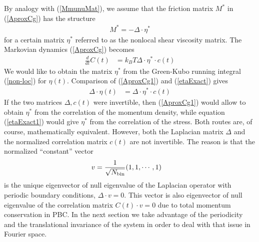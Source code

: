 \documentclass[b5paper,openright,10pt]{book}
\newcommand{\esc}{\!\cdot\!}
\begin{document}
By analogy with  (\ref{MmunuMat}), we assume that the  friction matrix $M^*$ in
(\ref{AproxCg}) has the structure
\begin{align}
  M^*=-\Delta\esc \eta^*
  \label{M*eta*}
\end{align}
for a  certain  matrix  $\eta^*$  referred to  as  the  nonlocal  shear
viscosity  matrix.  The Markovian  dynamics  (\ref{AproxCg})
becomes
\begin{align}
\frac{d}{dt}C(t)&=  k_BT\Delta\esc \eta^*\esc c(t)
\label{AproxCg1}
\end{align}
We  would like  to  obtain  the matrix  $\eta^*$  from the  Green-Kubo
running  integral   (\ref{non-loc})  for  $\eta(t)$.    Comparison  of
(\ref{AproxCg1}) and (\ref{etaExact}) gives
\begin{align}
 \Delta\esc \eta(t) &=\Delta\esc \eta^*\esc c(t)
\label{etaExact1}
\end{align}
If   the   two   matrices    $\Delta,c(t)$   were   invertible,   then
(\ref{AproxCg1}) would  allow to obtain $\eta^*$  from the correlation
of  the  momentum  density,  while equation  (\ref{etaExact1})  would  give
$\eta^*$  from the  correlation of  the  stress. Both  routes are,  of
course, mathematically equivalent.  However, both the Laplacian matrix
$\Delta$  and  the  normalized   correlation  matrix  $c(t)$  are  not
invertible.  The reason is that the normalized ``constant'' vector
\begin{align}
  v&=\frac{1}{\sqrt{N_{{\rm bin}}}}(1,1,\cdots,1)
\end{align}
is the unique eigenvector of null eigenvalue of the Laplacian operator
with periodic boundary conditions, $\Delta  \cdot v=0$. This vector is
also  eigenvector  of  null   eigenvalue  of  the  correlation  matrix
$C(t)\esc v=0$  due to total momentum  conservation in PBC. 
In the next section we take advantage of the periodicity and the translational invariance of the system in order to deal with that issue in Fourier space. 
\end{document}
